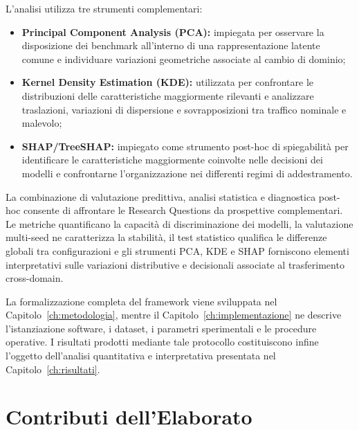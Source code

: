 L'analisi utilizza tre strumenti complementari:
\begin{itemize}
    \item \textbf{Principal Component Analysis (PCA):} impiegata per osservare la disposizione dei benchmark all'interno di una rappresentazione latente comune e individuare variazioni geometriche associate al cambio di dominio;

    \item \textbf{Kernel Density Estimation (KDE):} utilizzata per confrontare le distribuzioni delle caratteristiche maggiormente rilevanti e analizzare traslazioni, variazioni di dispersione e sovrapposizioni tra traffico nominale e malevolo;

    \item \textbf{SHAP/TreeSHAP:} impiegato come strumento post-hoc di spiegabilità per identificare le caratteristiche maggiormente coinvolte nelle decisioni dei modelli e confrontarne l'organizzazione nei differenti regimi di addestramento.
\end{itemize}

La combinazione di valutazione predittiva, analisi statistica e diagnostica post-hoc consente di affrontare le Research Questions da prospettive complementari. 
Le metriche quantificano la capacità di discriminazione dei modelli, la valutazione multi-seed ne caratterizza la stabilità, il test statistico qualifica le differenze globali tra configurazioni e gli strumenti PCA, KDE e SHAP forniscono elementi interpretativi sulle variazioni distributive e decisionali associate al trasferimento cross-domain.

La formalizzazione completa del framework viene sviluppata nel Capitolo~\ref{ch:metodologia}, mentre il Capitolo~\ref{ch:implementazione} ne descrive l'istanziazione software, i dataset, i parametri sperimentali e le procedure operative. 
I risultati prodotti mediante tale protocollo costituiscono infine l'oggetto dell'analisi quantitativa e interpretativa presentata nel Capitolo~\ref{ch:risultati}.




\section{Contributi dell'Elaborato}
\label{sec:intro_contributi}

